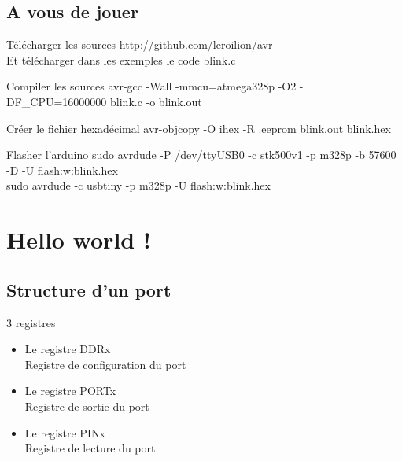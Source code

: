 \documentclass{beamer}
\begin{document}
\subsection{A vous de jouer}

\begin{frame}
  \begin{block}{T\'el\'echarger les sources}
    \pause
    \hyperlink{http://github.com/leroilion/avr}{http://github.com/leroilion/avr}\\
    Et t\'el\'echarger dans les exemples le code blink.c
  \end{block}
  \pause
  \begin{block}{Compiler les sources}
    \pause
    avr-gcc -Wall -mmcu=atmega328p -O2 -DF\_CPU=16000000 blink.c -o blink.out
  \end{block}
  \pause  
  \begin{block}{Cr\'eer le fichier hexad\'ecimal}
    \pause
    avr-objcopy -O ihex -R .eeprom blink.out blink.hex
  \end{block}
  \pause
  \begin{block}{Flasher l'arduino}
    \pause
    sudo avrdude -P /dev/ttyUSB0 -c stk500v1 -p m328p -b 57600 -D -U flash:w:blink.hex\\
    sudo avrdude -c usbtiny -p m328p -U flash:w:blink.hex
  \end{block}
\end{frame}

\section{Hello world !}

\begin{frame}
  \tableofcontents[currentsection]
\end{frame}

\subsection{Structure d'un port}

\begin{frame}
  \pause
  \begin{block}{3 registres}
    \begin{itemize}
      \pause
      \item Le registre DDRx\\
      Registre de configuration du port
      \pause
      \item Le registre PORTx\\
      Registre de sortie du port
      \pause
      \item Le registre PINx\\
      Registre de lecture du port
    \end{itemize}
  \end{block}
\end{frame}
\end{document}
